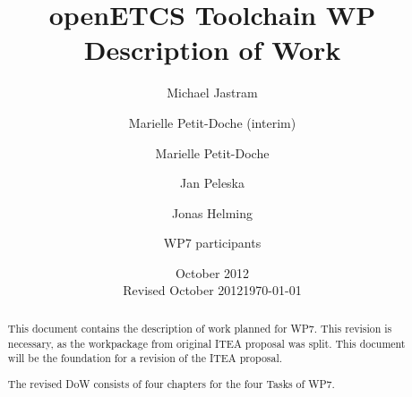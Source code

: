 \documentclass{template/openetcs_article}
\begin{document}
\frontmatter
{}




\title{openETCS Toolchain WP Description of Work}


\date{October 2012\\Revised October 2012}
\date{\today}


\author{Michael Jastram}


\author{Marielle Petit-Doche (interim)}

  
\author{Marielle Petit-Doche}

  
\author{Jan Peleska}


\author{Jonas Helming}


\author{WP7 participants}

    



\begin{abstract}
This document contains the description of work planned for WP7.  This revision is necessary, as the workpackage from original ITEA proposal was split.  This document will be the foundation for a revision of the ITEA proposal.

The revised DoW consists of four chapters for the four Tasks of WP7.

\end{abstract}
\end{document}

